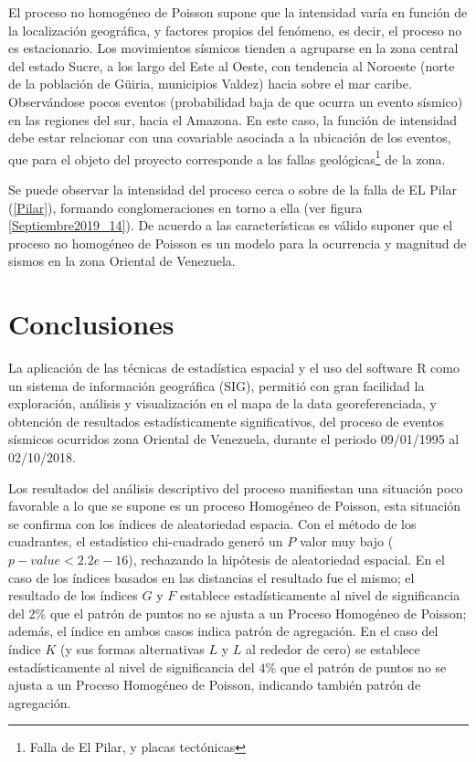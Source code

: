 \documentclass[12pt]{report}
\begin{document}
{{{{{{{{{{{{{{{  El proceso no homogéneo de Poisson supone que la intensidad varía en función de la localización geográfica, y factores propios del fenómeno, es decir, el proceso no es estacionario.  Los movimientos sísmicos tienden a agruparse en la zona central del estado Sucre, a los largo del Este al Oeste, con tendencia al Noroeste (norte de la población de Güiria, municipios Valdez)  hacia sobre el mar caribe. Observándose  pocos eventos (probabilidad baja de que ocurra un evento sísmico) en las regiones del sur, hacia el Amazona. En este caso, la función de intensidad debe estar  relacionar  con  una covariable asociada a la ubicación de los eventos, que para el objeto del proyecto corresponde a las fallas geológicas{\footnote{Falla de El Pilar, y placas tectónicas}} de  la zona.
  
   
   Se puede observar la intensidad del proceso cerca o sobre de la falla de EL Pilar (\ref{Pilar}), formando conglomeraciones en torno a ella (ver figura \ref{Septiembre2019_14}).    De acuerdo a las características es válido suponer que el proceso no homogéneo de Poisson es un modelo para la ocurrencia y magnitud de sismos en la zona Oriental de Venezuela. 


			\section{Conclusiones}{\label{Conclucion} }
			

  La aplicación de las técnicas de estadística espacial y el uso del software {\ttfamily R} como un sistema de información geográfica (SIG), permitió con gran facilidad la exploración,  análisis y visualización  en el mapa de la data georeferenciada, y obtención de  resultados estadísticamente significativos,  del proceso de eventos sísmicos ocurridos zona Oriental de Venezuela, durante el periodo  09/01/1995 al  02/10/2018.	

  Los resultados del análisis descriptivo del proceso  manifiestan una situación poco favorable a lo que se supone es un proceso Homogéneo de Poisson, esta situación se confirma con los índices de aleatoriedad espacia. Con el método de los cuadrantes, el estadístico chi-cuadrado generó un  $P$ valor muy bajo  {\ttfamily ($p-value < 2.2e-16 $)}, rechazando la hipótesis de aleatoriedad espacial. En el caso de los índices basados en las distancias el resultado fue el mismo; el resultado de los índices $G$ y $F$  establece estadísticamente al nivel de significancia del 2$\%$  que el patrón de puntos no se ajusta a un Proceso Homogéneo de Poisson; además, el índice en ambos casos indica  patrón de agregación. En el caso del índice $K$ (y sus formas alternativas  $L$ y $L$ al rededor de cero) se establece  estadísticamente al nivel de significancia del $4\%$ que el patrón de puntos no se ajusta a un Proceso Homogéneo de Poisson, indicando también  patrón de agregación.
  
}}}}}}}}}}}}}}}
\end{document}
